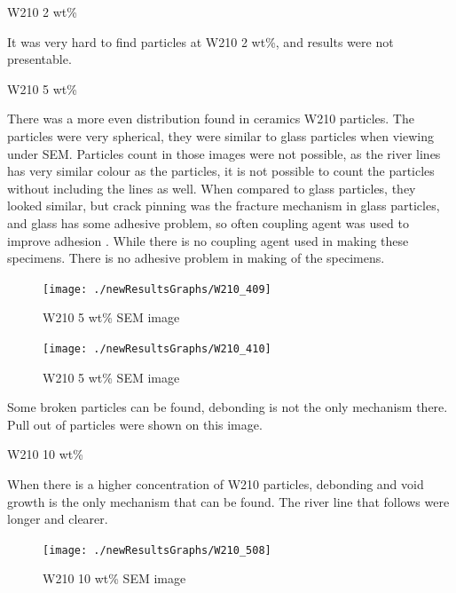 \documentclass[numbers=noendperiod,chapterprefix=on]{icldt} %
\begin{document}
{W210 2 wt\%

It was very hard to find particles at W210 2 wt\%, and results were not presentable.

W210 5 wt\%

There was a more even distribution found in ceramics W210 particles. The particles were very spherical, they were similar to glass particles when viewing under SEM. Particles count in those images were not possible, as the river lines has very similar colour as the particles, it is not possible to count the particles without including the lines as well.
When compared to glass particles, they looked similar, but crack pinning was the fracture mechanism in glass particles, and glass has some adhesive problem, so often coupling agent was used to improve adhesion \cite{Spanoudakis1984}.
While there is no coupling agent used in making these specimens. There is no adhesive problem in making of the specimens.

\begin{figure}[!hp]
\centering
\texttt{[image: ./newResultsGraphs/W210\_409]}
\caption{W210 5 wt\% SEM image} \label{W210_409}
\end{figure}
\FloatBarrier


\begin{figure}[!hp]
\centering
\texttt{[image: ./newResultsGraphs/W210\_410]}
\caption{W210 5 wt\% SEM image} \label{W210_410}
\end{figure}
\FloatBarrier

Some broken particles can be found, debonding is not the only mechanism there. Pull out of particles were shown on this image.

W210 10 wt\%

When there is a higher concentration of W210 particles, debonding and void growth is the only mechanism that can be found. The river line that follows were longer and clearer. 

\begin{figure}[!hp]
\centering
\texttt{[image: ./newResultsGraphs/W210\_508]}
\caption{W210 10 wt\% SEM image} \label{W210_508}
\end{figure}
\FloatBarrier

}
\end{document}
